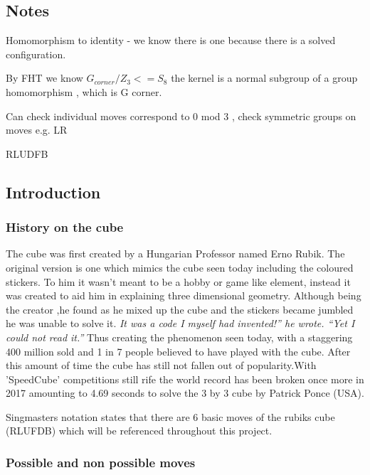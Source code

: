 \documentclass{article}
\begin{document}
 
\subsection*{Notes}	
Homomorphism to identity - we know there is one because there is a solved configuration.\newline

By FHT we know $G_{corner}/Z_{3} <= S_{8}$ the kernel is a normal subgroup of a group homomorphism , which is G corner.\newline

Can check individual moves correspond to 0 mod 3 , check symmetric groups on moves e.g. LR

RLUDFB

\subsection*{Introduction}

\paragraph*{}
\subsubsection*{History on the cube}
\cite{History}
The cube was first created by a Hungarian Professor named Erno Rubik. The original version is one which mimics the cube seen today including the coloured stickers. To him it wasn't meant to be a hobby or game like element, instead it was created to aid him in explaining three dimensional geometry. Although being the creator ,he found as he mixed up the cube and the stickers became jumbled he was unable to solve it.
\textit{It was a code I myself had invented!” he wrote. “Yet I could not read it.”}
Thus creating the phenomenon seen today, with a staggering 400 million sold and  1 in 7 people believed to have played with the cube. After this amount of time the cube has still not fallen out of popularity.With 'SpeedCube' competitions still rife the world record has been broken once more in 2017 amounting to 4.69 seconds to solve the 3 by 3 cube by Patrick Ponce (USA).\cite{Record}

Singmasters \cite{Magic}%
notation states that there are 6 basic moves of the rubiks cube (RLUFDB) which will be referenced throughout this project.
\subsubsection*{Possible and non possible moves}
\end{document}
